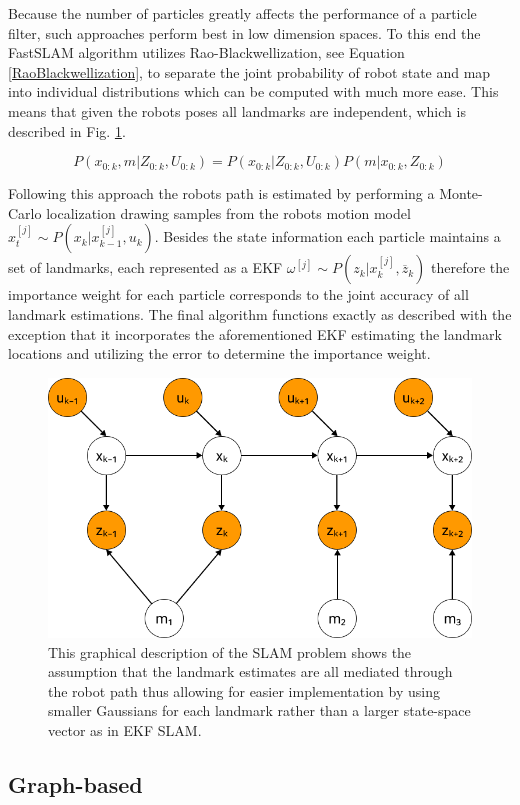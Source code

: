 Because the number of particles greatly affects the performance of a particle filter, such approaches perform best in low dimension spaces. To this end the FastSLAM algorithm utilizes Rao-Blackwellization, see Equation \ref{RaoBlackwellization}, to separate the joint probability of robot state and map into individual distributions which can be computed with much more ease.
This means that given the robots poses all landmarks are independent, which is described in Fig. \ref{fig:fastSlamGraphical}.

\begin{equation}\label{RaoBlackwellization}
	P(x_{0:k}, m | Z_{0:k}, U_{0:k}) = P(x_{0:k} | Z_{0:k}, U_{0:k}) P(m | x_{0:k}, Z_{0:k})
\end{equation}

Following this approach the robots path is estimated by performing a Monte-Carlo localization drawing samples from the robots motion model $x_{t}^{[j]} \sim P(x_{k} | x_{k-1}^{[j]}, u_{k}) $. Besides the state information each particle maintains a set of landmarks, each represented as a EKF $  \omega^{[j]} \sim P(z_{k} | x_{k}^{[j]}, \overline{z}_{k}) $ therefore the importance weight for each particle corresponds to the joint accuracy of all landmark estimations. 
The final algorithm functions exactly as described with the exception that it incorporates the aforementioned EKF estimating the landmark locations and utilizing the error to determine the importance weight. 


\begin{figure}
	\centering
	\includegraphics[width=0.5\linewidth]{img/FastSlamGraphical}
	\caption{
		This graphical description of the SLAM problem shows the assumption that the landmark estimates are all mediated through the robot path thus allowing for easier implementation by using smaller Gaussians for each landmark rather than a larger state-space vector as in EKF SLAM.
	}
	\label{fig:fastSlamGraphical}
\end{figure}

\subsection{Graph-based}



